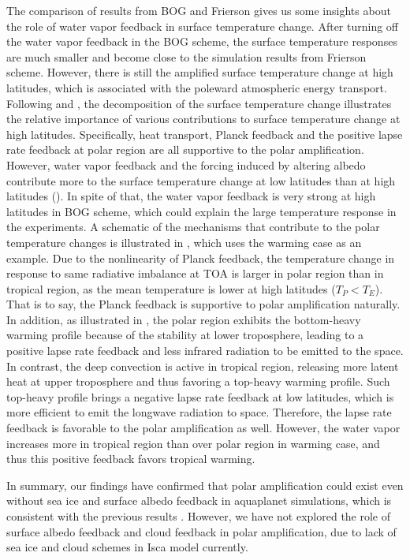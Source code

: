 The comparison of results from BOG and Frierson gives us some insights about the role of water vapor feedback in surface temperature change. After turning off the water vapor feedback in the BOG scheme, the surface temperature responses are much smaller and become close to the simulation results from Frierson scheme. However, there is still the amplified surface temperature change at high latitudes, which is associated with the poleward atmospheric energy transport. Following \cite{Feldl2013} and \cite{Kim2018}, the decomposition of the surface temperature change illustrates the relative importance of various contributions to surface temperature change at high latitudes. Specifically, heat transport, Planck feedback and the positive lapse rate feedback at polar region are all supportive to the polar amplification. However, water vapor feedback and the forcing induced by altering albedo contribute more to the surface temperature change at low latitudes than at high latitudes (). In spite of that, the water vapor feedback is very strong at high latitudes in BOG scheme, which could explain the large temperature response in the experiments. A schematic of the mechanisms that contribute to the polar temperature changes is illustrated in , which uses the warming case as an example. Due to the nonlinearity of Planck feedback, the temperature change in response to same radiative imbalance at TOA is larger in polar region than in tropical region, as the mean temperature is lower at high latitudes ($T_P<T_E$). That is to say, the Planck feedback is supportive to polar amplification naturally. In addition, as illustrated in , the polar region exhibits the bottom-heavy warming profile because of the stability at lower troposphere, leading to a positive lapse rate feedback and less infrared radiation to be emitted to the space. In contrast, the deep convection is active in tropical region, releasing more latent heat at upper troposphere and thus favoring a top-heavy warming profile. Such top-heavy profile brings a negative lapse rate feedback at low latitudes, which is more efficient to emit the longwave radiation to space. Therefore, the lapse rate feedback is favorable to the polar amplification as well. However, the water vapor increases more in tropical region than over polar region in warming case, and thus this positive feedback favors tropical warming.

In summary, our findings have confirmed that polar amplification could exist even without sea ice and surface albedo feedback in aquaplanet simulations, which is consistent with the previous results \citep{Langen2007,Kim2018,Alexeev2005}. However, we have not explored the role of surface albedo feedback and cloud feedback in polar amplification, due to lack of sea ice and cloud schemes in Isca model currently.

